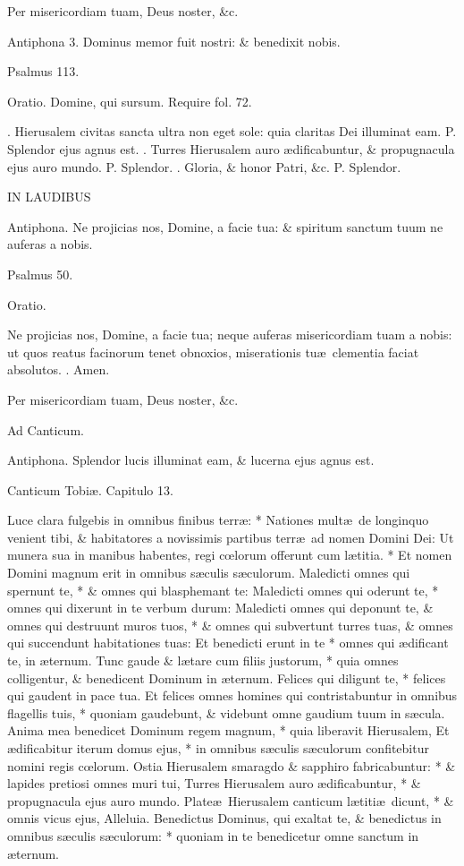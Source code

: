 \documentclass[letter,11pt]{book}
\makeatletter
\DeclareRobustCommand{\Vbar}{\vers@resp{-0.1em}{V}}
\DeclareRobustCommand{\Rbar}{\vers@resp{0pt}{R}}
\newcommand{\vers@resp@sym}{\raisebox{0.2ex}{\rotatebox[origin=c]{-20}{$\m@th\rceil$}}}
\newcommand{\vers@resp}[2]{%
  {\ooalign{\hidewidth\kern#1\vers@resp@sym\hidewidth\cr#2\cr}}%
}%
\def\P{\color{Red} P. \color{black}}
\def\V{\color{Red} \Vbar . \color{black}}
\def\R{\color{Red} \Rbar . \color{black}}
\makeatother
\begin{document}
\begin{multicols*}{2}
Per misericordiam tuam, Deus noster, \&c.

Antiphona 3. Dominus memor fuit nostri: \& benedixit nobis.

Psalmus 113.

Oratio. Domine, qui sursum. Require fol. 72.

\R Hierusalem civitas sancta ultra non eget sole: quia claritas Dei illuminat eam. \P Splendor ejus agnus est. \V Turres Hierusalem auro \ae dificabuntur, \& propugnacula ejus auro mundo. \P Splendor. \V Gloria, \& honor Patri, \&c. \P Splendor.

IN LAUDIBUS

Antiphona. Ne projicias nos, Domine, a facie tua: \& spiritum sanctum tuum ne auferas a nobis.

Psalmus 50.

Oratio.

Ne projicias nos, Domine, a facie tua; neque auferas misericordiam tuam a nobis: ut quos reatus facinorum tenet obnoxios, miserationis tu\ae \ clementia faciat absolutos.
\R Amen.

Per misericordiam tuam, Deus noster, \&c.

Ad Canticum.

Antiphona. Splendor lucis illuminat eam, \& lucerna ejus agnus est.

Canticum Tobi\ae . Capitulo 13.

Luce clara fulgebis in omnibus finibus terr\ae : * Nationes mult\ae \ de longinquo venient tibi, \& habitatores a novissimis partibus terr\ae \ ad nomen Domini Dei:
Ut munera sua in manibus habentes, regi c\oe lorum offerunt cum l\ae titia. * Et nomen Domini magnum erit in omnibus s\ae culis s\ae culorum.
Maledicti omnes qui spernunt te, * \& omnes qui blasphemant te:
Maledicti omnes qui oderunt te, * omnes qui dixerunt in te verbum durum:
Maledicti omnes qui deponunt te, \& omnes qui destruunt muros tuos, * \& omnes qui subvertunt turres tuas, \& omnes qui succendunt habitationes tuas:
Et benedicti erunt in te * omnes qui \ae dificant te, in \ae ternum.
Tunc gaude \& l\ae tare cum filiis justorum, * quia omnes colligentur, \& benedicent Dominum in \ae ternum.
Felices qui diligunt te, * felices qui gaudent in pace tua.
Et felices omnes homines qui contristabuntur in omnibus flagellis tuis, * quoniam gaudebunt, \& videbunt omne gaudium tuum in s\ae cula.
Anima mea benedicet Dominum regem magnum, * quia liberavit Hierusalem,
Et \ae dificabitur iterum domus ejus, * in omnibus s\ae culis s\ae culorum confitebitur nomini regis c\oe lorum.
Ostia Hierusalem smaragdo \& sapphiro fabricabuntur: * \& lapides pretiosi omnes muri tui,
Turres Hierusalem auro \ae dificabuntur, * \& propugnacula ejus auro mundo.
Plate\ae \ Hierusalem canticum l\ae titi\ae \ dicunt, * \& omnis vicus ejus, Alleluia.
Benedictus Dominus, qui exaltat te, \& benedictus in omnibus s\ae culis s\ae culorum: * quoniam in te benedicetur omne sanctum in \ae ternum.


\end{multicols*}
\end{document}

